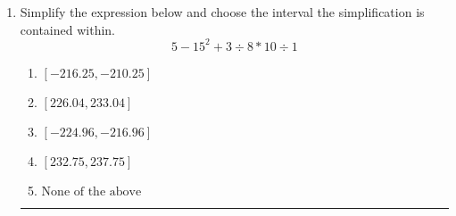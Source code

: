 \documentclass[14pt]{extbook}
\newcommand{\litem}[1]{\item#1\hspace*{-1cm}\rule{\textwidth}{0.4pt}}
\begin{document}
\begin{enumerate}
\litem{
Simplify the expression below and choose the interval the simplification is contained within.\[ 5 - 15^2 + 3 \div 8 * 10 \div 1 \]\begin{enumerate}[label=\Alph*.]
\item \( [-216.25, -210.25] \)
\item \( [226.04, 233.04] \)
\item \( [-224.96, -216.96] \)
\item \( [232.75, 237.75] \)
\item \( \text{None of the above} \)

\end{enumerate} }
\end{enumerate}
\end{document}
